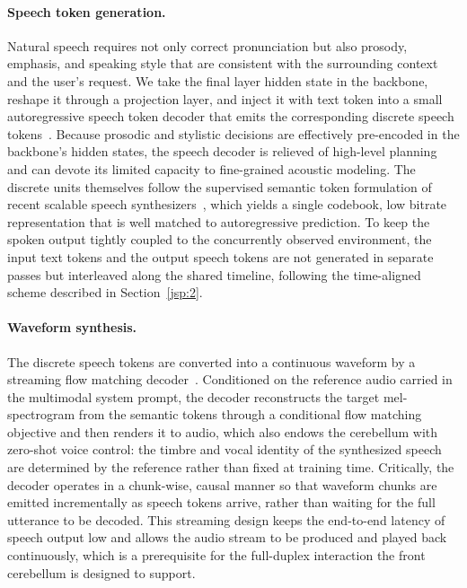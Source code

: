 \paragraph{Speech token generation.} Natural speech requires not only correct pronunciation but also prosody, emphasis, and speaking style that are consistent with the surrounding context and the user's request. We take the final layer hidden state in the backbone, reshape it through a projection layer, and inject it with text token into a small autoregressive speech token decoder that emits the corresponding discrete speech tokens~\cite{du2024cosyvoice1}. Because prosodic and stylistic decisions are effectively pre-encoded in the backbone's hidden states, the speech decoder is relieved of high-level planning and can devote its limited capacity to fine-grained acoustic modeling. The discrete units themselves follow the supervised semantic token formulation of recent scalable speech synthesizers~\cite{du2024cosyvoice2}, which yields a single codebook, low bitrate representation that is well matched to autoregressive prediction. To keep the spoken output tightly coupled to the concurrently observed environment, the input text tokens and the output speech tokens are not generated in separate passes but interleaved along the shared timeline, following the time-aligned scheme described in Section~\ref{jsp:2}.

\vspace{-0.5cm}

\paragraph{Waveform synthesis.} The discrete speech tokens are converted into a continuous waveform by a streaming flow matching decoder~\cite{du2024cosyvoice2,cosyvoice3}. Conditioned on the reference audio carried in the multimodal system prompt, the decoder reconstructs the target mel-spectrogram from the semantic tokens through a conditional flow matching objective and then renders it to audio, which also endows the cerebellum with zero-shot voice control: the timbre and vocal identity of the synthesized speech are determined by the reference rather than fixed at training time. Critically, the decoder operates in a chunk-wise, causal manner so that waveform chunks are emitted incrementally as speech tokens arrive, rather than waiting for the full utterance to be decoded. This streaming design keeps the end-to-end latency of speech output low and allows the audio stream to be produced and played back continuously, which is a prerequisite for the full-duplex interaction the front cerebellum is designed to support.







